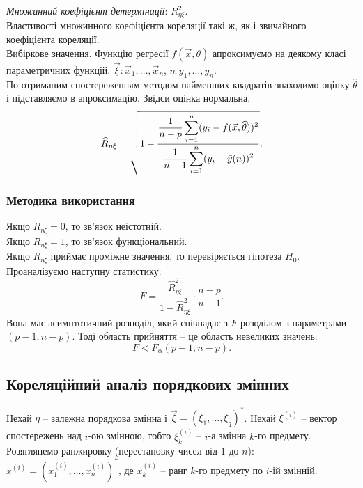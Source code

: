 \textit{Множинний коефіцієнт детермінації}: $R_{\eta\xi}^2$. \\

Властивості множинного коефіцієнта кореляції такі ж, як і звичайного коефіцієнта кореляції. \\

Вибіркове значення. Функцію регресії $f(\vec x,\theta)$ апроксимуємо на деякому класі параметричних функцій. $\vec\xi:\vec x_1, \ldots, \vec x_n$, $\eta: y_1, \ldots, y_n$. \\

По отриманим спостереженням методом найменших квадратів знаходимо оцінку $\widehat{\theta}$ і підставляємо в апроксимацію. Звідси оцінка нормальна. \[ \widehat{R}_{\eta\xi} = \sqrt{1 - \dfrac{\dfrac{1}{n-p}\displaystyle\sum\limits_{i=1}^n (y_i - f(\vec{x}, \widehat{\theta}))^2}{\dfrac{1}{n-1}\displaystyle\sum\limits_{i=1}^n(y_i-\bar{y}(n))^2}}.\]
\subsubsection{Методика використання}
Якщо $R_{\eta\xi} = 0$, то зв'язок неістотній. \\

Якщо $R_{\eta\xi} = 1$, то зв'язок функціональний. \\

Якщо $R_{\eta\xi}$ приймає проміжне значення, то перевіряється гіпотеза $H_0$. \\

Проаналізуємо наступну статистику: \[F = \dfrac{\widehat{R}_{\eta\xi}^2}{1-\widehat{R}_{\eta\xi}^2} \cdot \dfrac{n - p}{n - 1}.\] Вона має асимптотичний розподіл, який співпадає з $F$-розоділом з параметрами $(p-1,n-p)$. Тоді область прийняття -- це область невеликих значень: \[F < F_\alpha(p-1, n - p).\]
\subsection{Кореляційний аналіз порядкових змінних}
Нехай $\eta$ -- залежна порядкова змінна і $\vec \xi = (\xi_1, \ldots, \xi_q)^*$. Нехай $\xi^{(i)}$ -- вектор спостережень над $i$-ою змінною, тобто $\xi_k^{(i)}$ -- $i$-а змінна $k$-го предмету. \\

Розяглянемо ранжировку (перестановку чисел від $1$ до $n$): $x^{(i)} = \left(x_1^{(i)}, \ldots, x_n^{(i)}\right)^*$, де $x_k^{(i)}$ -- ранг $k$-го предмету по $i$-ій змінній. \\
